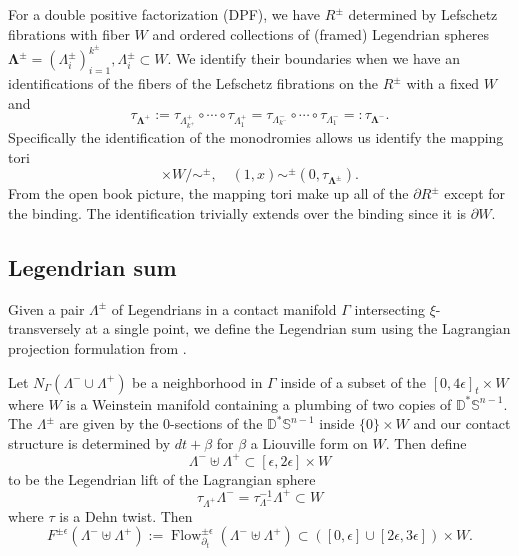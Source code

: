 \documentclass[11pt]{amsart}
\DeclareMathOperator{\Flow}{Flow}
\newcommand{\thicc}[1]{\pmb{#1}}
\newcommand{\disk}{\mathbb{D}}
\newcommand{\sphere}{\mathbb{S}}
\newcommand{\posNegRegion}{R^{\pm}}
\newcommand{\Leg}{\Lambda}
\newcommand{\posLeg}{\Leg^{+}}
\newcommand{\negLeg}{\Leg^{-}}
\newcommand{\thiccPosLeg}{\thicc{\Leg}^{+}}
\newcommand{\thiccNegLeg}{\thicc{\Leg}^{-}}
\newcommand{\thiccPosNegLeg}{\thicc{\Leg}^{\pm}}
\newcommand{\posNegLeg}{\Leg^{\pm}}
\newcommand{\divSet}{\Gamma}
\begin{document}
For a double positive factorization (DPF), we have $\posNegRegion$ determined by Lefschetz fibrations with fiber $W$ and ordered collections of (framed) Legendrian spheres $\thiccPosNegLeg = (\posNegLeg_{i})_{i=1}^{k^{\pm}}, \posNegLeg_{i} \subset W$. We identify their boundaries when we have an identifications of the fibers of the Lefschetz fibrations on the $\posNegRegion$ with a fixed $W$ and
\begin{equation*}
\tau_{\thiccPosLeg} := \tau_{\posLeg_{k^{+}}} \circ \cdots \circ \tau_{\posLeg_{1}} = \tau_{\negLeg_{k^{-}}} \circ \cdots \circ \tau_{\negLeg_{1}} =: \tau_{\thiccNegLeg}.
\end{equation*}
Specifically the identification of the monodromies allows us identify the mapping tori
\begin{equation*}
[0, 1] \times W/ \sim^{\pm}, \quad (1, x) \sim^{\pm} (0, \tau_{\thiccPosNegLeg}).
\end{equation*}
From the open book picture, the mapping tori make up all of the $\partial \posNegRegion$ except for the binding. The identification trivially extends over the binding since it is $\partial W$.

\subsection{Legendrian sum}

Given a pair $\posNegLeg$ of Legendrians in a contact manifold $\divSet$ intersecting $\xi$-transversely at a single point, we define the Legendrian sum using the Lagrangian projection formulation from \cite{HH:Bypass}.

Let $N_{\divSet}(\negLeg \cup \posLeg)$ be a neighborhood in $\divSet$ inside of a subset of the $[0, 4\epsilon]_{t} \times W$ where $W$ is a Weinstein manifold containing a plumbing of two copies of $\disk^{\ast}\sphere^{n-1}$. The $\posNegLeg$ are given by the $0$-sections of the $\disk^{\ast}\sphere^{n-1}$ inside $\{0\} \times W$ and our contact structure is determined by $dt + \beta$ for $\beta$ a Liouville form on $W$. Then define
\begin{equation*}
\negLeg \uplus \posLeg \subset [\epsilon, 2\epsilon] \times W
\end{equation*}
to be the Legendrian lift of the Lagrangian sphere
\begin{equation*}
\tau_{\posLeg} \negLeg = \tau_{\negLeg}^{-1} \posLeg \subset W
\end{equation*}
where $\tau$ is a Dehn twist. Then
\begin{equation*}
F^{\pm\epsilon}(\negLeg \uplus \posLeg) := \Flow_{\partial_{t}}^{\pm \epsilon}(\negLeg \uplus \posLeg) \subset ([0, \epsilon] \cup [2\epsilon, 3\epsilon]) \times W.
\end{equation*}
\end{document}
